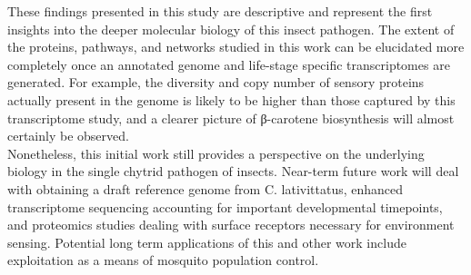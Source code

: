 \indent These findings presented in this study are descriptive and represent the first insights into the deeper molecular biology of this insect pathogen. The extent of the proteins, pathways, and networks studied in this work can be elucidated more completely once an annotated genome and life-stage specific transcriptomes are generated. For example, the diversity and copy number of sensory proteins actually present in the genome is likely to be higher than those captured by this transcriptome study, and a clearer picture of β-carotene biosynthesis will almost certainly be observed. \\
\indent Nonetheless, this initial work still provides a perspective on the underlying biology in the single chytrid pathogen of insects. Near-term future work will deal with obtaining a draft reference genome from C. lativittatus, enhanced transcriptome sequencing accounting for important developmental timepoints, and proteomics studies dealing with surface receptors necessary for environment sensing. Potential long term applications of this and other work include exploitation as a means of mosquito population control. \\
